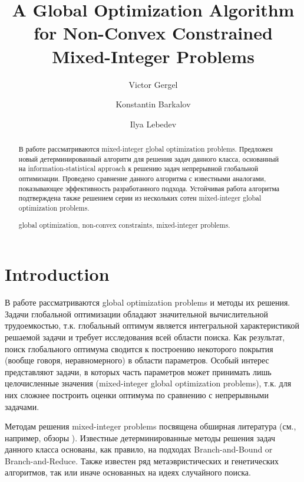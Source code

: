 \documentclass{llncs}
\begin{document}
\mainmatter 

\title{A Global Optimization Algorithm for Non-Convex Constrained Mixed-Integer Problems}
\author{Victor Gergel \and Konstantin Barkalov \and Ilya Lebedev %
\\
}


\maketitle

\begin{abstract}
\Russian
В работе рассматриваются mixed-integer global optimization problems. Предложен новый детерминированный алгоритм для решения задач данного класса, основанный на information-statistical approach к решению задач непрерывной глобальной оптимизации. Проведено сравнение данного алгоритма с известными аналогами, показывающее эффективность разработанного подхода. Устойчивая работа алгоритма подтверждена также решением серии из нескольких сотен mixed-integer global optimization problems. 

\keywords global optimization, non-convex constraints, mixed-integer problems.

\end{abstract}

\section{Introduction}\label{sec:intro}
\Russian
В работе рассматриваются global optimization problems и методы их решения. Задачи глобальной оптимизации обладают значительной вычислительной трудоемкостью, т.к. глобальный оптимум является интегральной характеристикой решаемой задачи и требует исследования всей области поиска. Как результат, поиск глобального оптимума сводится к построению некоторого покрытия (вообще говоря, неравномерного) в области параметров. Особый интерес представляют задачи, в которых часть параметров может принимать лишь целочисленные значения (mixed-integer global optimization problems), т.к. для них сложнее построить оценки оптимума по сравнению с непрерывными задачами.

Методам решения mixed-integer problems посвящена обширная литература (см., например, обзоры \cite{Burer,Boukouvala}). Известные детерминированные методы решения задач данного класса основаны, как правило, на подходах Branch-and-Bound or Branch-and-Reduce. Также известен ряд метаэвристических и генетических алгоритмов, так или иначе основанных на идеях случайного поиска.
\end{document}
